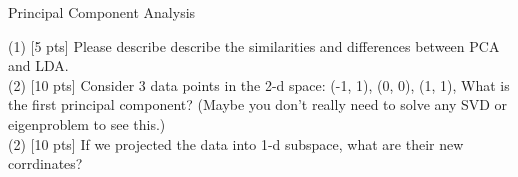 \documentclass[11pt, a4paper, UTF8]{ctexart}
\begin{document}
\begin{problem}[ML problem 4]
	[25pts] Principal Component Analysis 
	
(1) [5 pts] Please describe describe the similarities and differences between PCA and LDA.\\
(2) [10 pts] Consider 3 data points in the 2-d space: (-1, 1), (0, 0), (1, 1), What is the first principal component? (Maybe you don't really need to solve any SVD or eigenproblem to see this.)\\
(2) [10 pts] If we projected the data into 1-d subspace, what are their new corrdinates?

\end{problem}
\begin{solution}
  
\end{solution}







   





	
    


%


\end{document}

